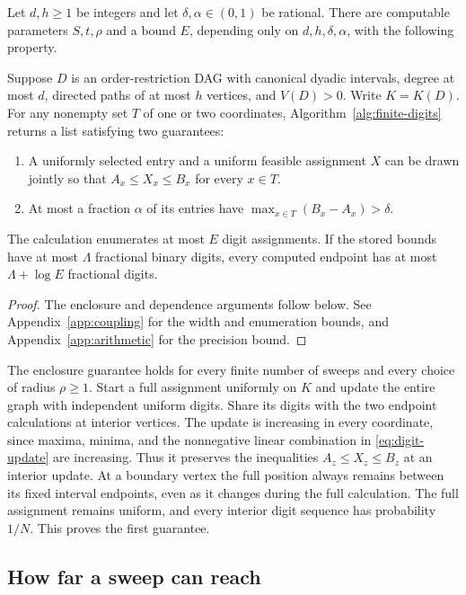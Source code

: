 \begin{theorem}\label{thm:local}
Let $d,h\ge1$ be integers and let $\delta,\alpha\in(0,1)$ be rational.
There are computable parameters $S,t,\rho$ and a bound $E$, depending
only on $d,h,\delta,\alpha$, with the following property.

Suppose $D$ is an order-restriction DAG with canonical dyadic intervals,
degree at most $d$, directed paths of at most $h$ vertices, and
$V(D)>0$. Write $K=K(D)$. For any nonempty set $T$ of
one or two coordinates, Algorithm~\ref{alg:finite-digits} returns a list
satisfying two guarantees:
\begin{enumerate}
\item A uniformly selected entry and a uniform feasible assignment $X$ can
be drawn jointly so that $A_x\le X_x\le B_x$ for every $x\in T$.
\item At most a fraction $\alpha$ of its entries have
$\max_{x\in T}(B_x-A_x)>\delta$.
\end{enumerate}
The calculation enumerates at most $E$ digit assignments. If the stored
bounds have at most $\Lambda$ fractional binary digits, every computed
endpoint has at most $\Lambda+\log E$ fractional digits.
\end{theorem}
\begin{proof}
The enclosure and dependence arguments follow below. See
Appendix~\ref{app:coupling} for the width and enumeration bounds, and
Appendix~\ref{app:arithmetic} for the precision bound.
\end{proof}

The enclosure guarantee holds for every finite number of sweeps and
every choice of radius $\rho\ge1$. Start a full assignment uniformly on
$K$ and update the entire graph with independent uniform digits. Share
its digits with the two endpoint calculations at interior vertices.
The update is increasing in every coordinate, since maxima, minima, and
the nonnegative linear combination in \eqref{eq:digit-update} are
increasing. Thus it preserves the inequalities $A_z\le X_z\le B_z$ at
an interior update. At a boundary vertex the full position always remains
between its fixed interval endpoints, even as it changes during the full
calculation. The full assignment remains uniform, and every interior
digit sequence has probability $1/N$. This proves the first guarantee.

\subsection{How far a sweep can reach}\label{sec:finite-dependence}

